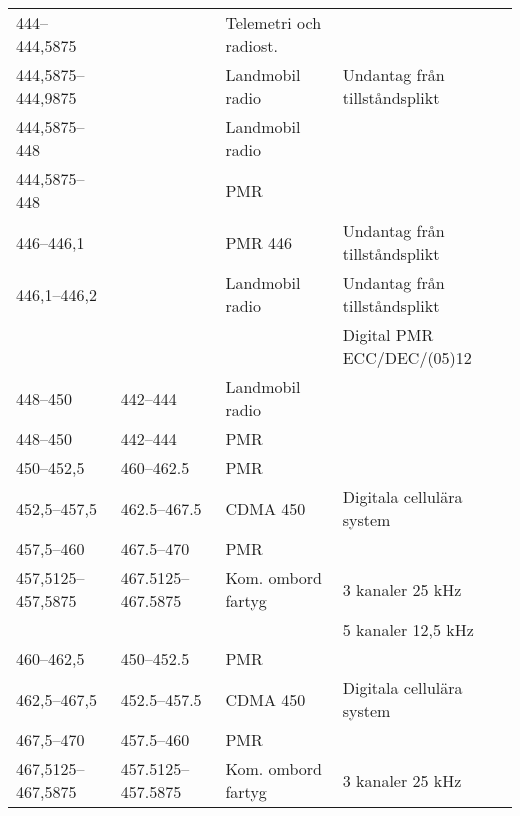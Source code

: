 \begin{landscape}
\begin{landscape}
\begin{longtable}{llll}
	444--444,5875      &                    & Telemetri och radiost.  &                                       \\
	444,5875--444,9875 &                    & Landmobil radio         & Undantag från tillståndsplikt         \\
	444,5875--448      &                    & Landmobil radio         &                                       \\
	444,5875--448      &                    & PMR                     &                                       \\
	446--446,1         &                    & PMR 446                 & Undantag från tillståndsplikt         \\
	446,1--446,2       &                    & Landmobil radio         & Undantag från tillståndsplikt         \\
	                   &                    &                         & Digital PMR ECC/DEC/(05)12            \\
	448--450           & 442--444           & Landmobil radio         &                                       \\
	448--450           & 442--444           & PMR                     &                                       \\
	450--452,5         & 460--462.5         & PMR                     &                                       \\
	452,5--457,5       & 462.5--467.5       & CDMA 450                & Digitala cellulära system             \\
	457,5--460         & 467.5--470         & PMR                     &                                       \\
	457,5125--457,5875 & 467.5125--467.5875 & Kom. ombord fartyg      & 3 kanaler 25 kHz                      \\
	                   &                    &                         & 5 kanaler 12,5 kHz                    \\
	460--462,5         & 450--452.5         & PMR                     &                                       \\
	462,5--467,5       & 452.5--457.5       & CDMA 450                & Digitala cellulära system             \\
	467,5--470         & 457.5--460         & PMR                     &                                       \\
	467,5125--467,5875 & 457.5125--457.5875 & Kom. ombord  fartyg     & 3 kanaler 25 kHz                      \\

\end{longtable}
\end{landscape}
\end{landscape}
